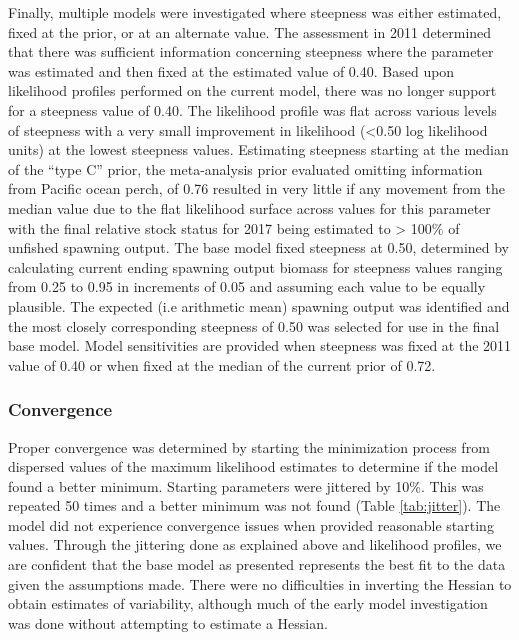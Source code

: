 \documentclass[12pt,]{article}
\begin{document}
Finally, multiple models were investigated where steepness was either
estimated, fixed at the prior, or at an alternate value. The assessment
in 2011 determined that there was sufficient information concerning
steepness where the parameter was estimated and then fixed at the
estimated value of 0.40. Based upon likelihood profiles performed on the
current model, there was no longer support for a steepness value of
0.40. The likelihood profile was flat across various levels of steepness
with a very small improvement in likelihood (\textless{}0.50 log
likelihood units) at the lowest steepness values. Estimating steepness
starting at the median of the ``type C'' prior, the meta-analysis prior
evaluated omitting information from Pacific ocean perch, of 0.76
resulted in very little if any movement from the median value due to the
flat likelihood surface across values for this parameter with the final
relative stock status for 2017 being estimated to \textgreater{} 100\%
of unfished spawning output. The base model fixed steepness at 0.50,
determined by calculating current ending spawning output biomass for
steepness values ranging from 0.25 to 0.95 in increments of 0.05 and
assuming each value to be equally plausible. The expected (i.e
arithmetic mean) spawning output was identified and the most closely
corresponding steepness of 0.50 was selected for use in the final base
model. Model sensitivities are provided when steepness was fixed at the
2011 value of 0.40 or when fixed at the median of the current prior of
0.72.

\subsubsection{Convergence}\label{convergence}

Proper convergence was determined by starting the minimization process
from dispersed values of the maximum likelihood estimates to determine
if the model found a better minimum. Starting parameters were jittered
by 10\%. This was repeated 50 times and a better minimum was not found
(Table \ref{tab:jitter}). The model did not experience convergence
issues when provided reasonable starting values. Through the jittering
done as explained above and likelihood profiles, we are confident that
the base model as presented represents the best fit to the data given
the assumptions made. There were no difficulties in inverting the
Hessian to obtain estimates of variability, although much of the early
model investigation was done without attempting to estimate a Hessian.
\end{document}
